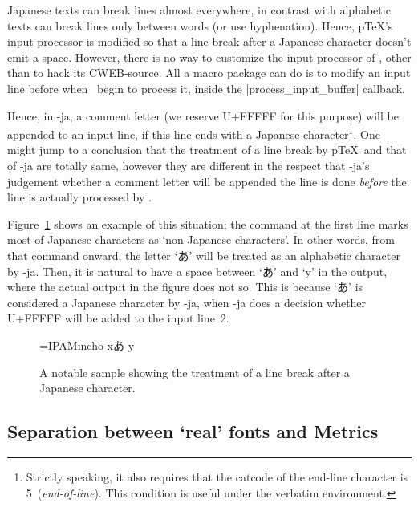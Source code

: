 \documentclass{ajt}
\begin{document}
Japanese texts can break lines almost everywhere, in contrast with
alphabetic texts can break lines only between words (or use
hyphenation). Hence, p\TeX's input processor is modified so that a
line-break after a Japanese character doesn't emit a space. However,
there is no way to customize the input processor of \LuaTeX, other than
to hack its CWEB-source. All a macro package can do is to modify an input line before
when \LuaTeX\ begin to process it, inside the |process_input_buffer|
callback.

Hence, in \LuaTeX-ja, a comment letter (we reserve U+FFFFF for this
purpose) will be appended to an input line, if this line ends with a Japanese
character\footnote{Strictly speaking, it also requires that the catcode
of the end-line character is 5~(\emph{end-of-line}). This condition is
useful under the verbatim environment.}. One might jump to a conclusion
that the treatment of a line break by p\TeX\ and that of \LuaTeX-ja are
totally same, however they are different in the respect that \LuaTeX-ja's
judgement whether a comment letter will be appended the line is done
\emph{before} the line is actually processed by \LuaTeX.

Figure~\ref{fig-linebreak} shows an example of this situation; the
command at the first line marks most of Japanese characters as
`non-Japanese characters'. In other words, from that command onward, the
letter `あ' will be treated as an alphabetic character by
\LuaTeX-ja. Then, it is natural to have a space between `あ' and `y' in
the output, where the actual output in the figure does not so.  This is
because `あ' is considered a Japanese character by \LuaTeX-ja,
when \LuaTeX-ja does a decision whether U+FFFFF will be added to the
input line~2.

\begin{figure}
\begin{LTXexample}
\font\x=IPAMincho \x
{}xあ
y
\end{LTXexample}
\caption{A notable sample showing the treatment of a line break after a
Japanese character.}\label{fig-linebreak}
\end{figure}

\subsection{Separation between `real' fonts and Metrics}
\label{ssec-sepmet}
\end{document}
